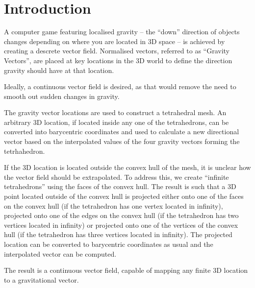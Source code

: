 \section{Introduction}

A computer game featuring localised gravity -- the ``down'' direction of objects
changes  depending on where you are located  in  3D  space  --  is  achieved  by
creating a descrete  vector  field. Normalised vectors, referred to as ``Gravity
Vectors'', are placed at key locations  in  the 3D world to define the direction
gravity should have at that location.

Ideally, a continuous vector field is desired,  as that would remove the need to
smooth out  sudden  changes in gravity.

The  gravity  vector locations are used to  construct  a  tetrahedral  mesh.  An
arbitrary 3D location, if located inside any  one  of  the  tetrahedrons, can be
converted into barycentric coordinates and used  to  calculate a new directional
vector based on the interpolated values of the four  gravity vectors forming the
tetrhahedron.

If the 3D location is located outside the convex hull of the mesh, it is unclear
how  the  vector  field should be  extrapolated.  To  address  this,  we  create
``infinite tetrahedrons'' using the faces of the convex hull. The result is such
that a 3D  point located outside of the convex hull is projected either onto one
of the faces on the convex  hull  (if  the tetrahedron has one vertex located in
infinity),  projected  onto  one  of the  edges  on  the  convex  hull  (if  the
tetrahedron has two vertices  located  in infinity) or projected onto one of the
vertices  of  the  convex hull (if the tetrahedron has three vertices located in
infinity). The projected location can be converted to barycentric coordinates as
usual and the interpolated vector can be computed.

The  result is a continuous vector field,  capable  of  mapping  any  finite  3D
location to a gravitational vector.
